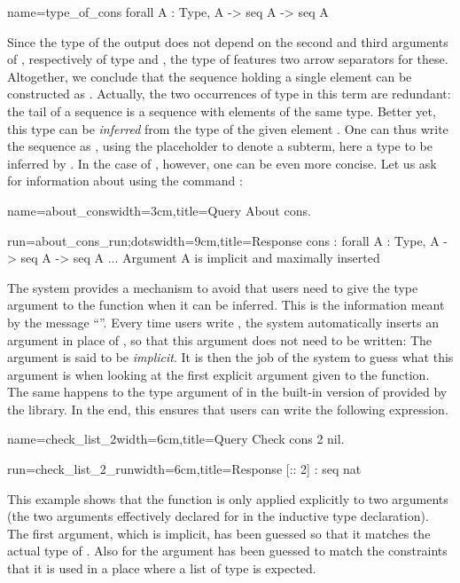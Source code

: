 \begin{coq}{name=type_of_cons}{}
  forall A : Type, A -> seq A -> seq A
\end{coq}
 Since the type of
the output does not depend on the second and third arguments of
, respectively of type  and , the type of
 features two arrow separators for these.
Altogether, we conclude
that the sequence holding a single element  can be
constructed as
. Actually, the two
occurrences of type  in this term are redundant: the tail of a
sequence is a sequence with elements of the same type. Better yet,
this type can be
\emph{inferred} from the type of the given element . One can
thus write the sequence as  , using the
placeholder \C{_} to
denote  a subterm, here a type to be inferred by \Coq{}.
In the case of , however,
one can be even more concise. Let us ask for
information about  using the command :

\begin{coq-left}{name=about_cons}{width=3cm,title=Query}
About cons.
$~$
$~$
\end{coq-left}
\begin{coqout-right}{run=about_cons_run;dots}{width=9cm,title=Response}
cons : forall A : Type, A -> seq A -> seq A
...
Argument A is implicit and maximally inserted
\end{coqout-right}

The \Coq{} system provides a mechanism to avoid that
users need to give the type argument to the  function when it
can be inferred.  This is
the information meant by the message ``''.  Every time users write , the system automatically
inserts an argument in place of , so that this argument does not
need to be written: The argument is said to be {\em implicit}. It is then the
job of the \Coq{} system to guess what this argument is when looking at
the first explicit argument given to the function.  The same happens
to the type argument of  in the built-in version of 
provided by the \mcbMC{} library.  In the end, this ensures that users can
write the following expression.

\begin{coq-left}{name=check_list_2}{width=6cm,title=Query}
Check cons 2 nil.
\end{coq-left}
\begin{coqout-right}{run=check_list_2_run}{width=6cm,title=Response}
[:: 2] : seq nat
\end{coqout-right}
\index[coq]{\C{(_ :: _)}}
This example shows that the function  is only applied
explicitly to two arguments (the two arguments effectively declared
for  in the inductive type declaration).
The first argument, which is implicit,
has been guessed so that it matches the actual type of .  Also for
 the argument has been guessed to match the constraints
that it is used in a place where a list of type  is expected.


